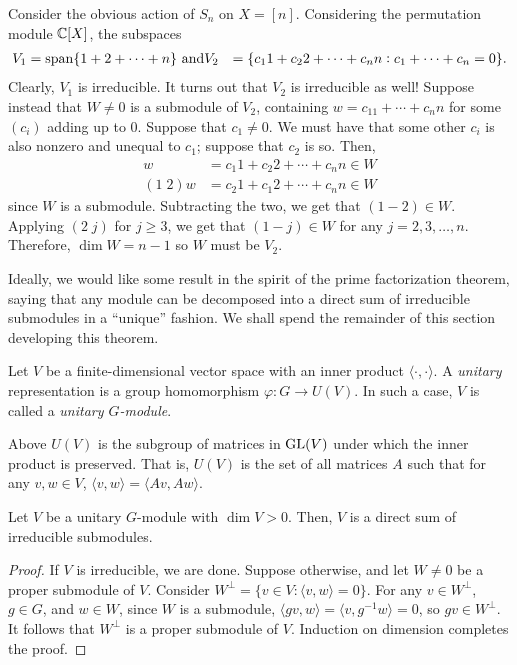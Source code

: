 	\begin{fex}
		Consider the obvious action of $S_n$ on $X = [n]$. Considering the permutation module $\mathbb{C}[X]$, the subspaces
		\begin{align*}
			V_1 &= \operatorname{span}\{1+2+\cdots+n\} \text{ and}
			V_2 &= \{c_11 + c_22 + \cdots + c_nn : c_1 + \cdots + c_n = 0\}.
		\end{align*}
		Clearly, $V_1$ is irreducible. It turns out that $V_2$ is irreducible as well! Suppose instead that $W \ne 0$ is a submodule of $V_2$, containing $w = c_11 + \cdots + c_nn$ for some $(c_i)$ adding up to $0$. Suppose that $c_1 \ne 0$. We must have that some other $c_i$ is also nonzero and unequal to $c_1$; suppose that $c_2$ is so. Then,
		\begin{align*}
			w &= c_1 1 + c_2 2 + \cdots + c_nn \in W \\
			(1\; 2) w &= c_2 1 + c_1 2 + \cdots + c_n n \in W
		\end{align*}
		since $W$ is a submodule. Subtracting the two, we get that $(1-2) \in W$. Applying $(2\; j)$ for $j \ge 3$, we get that $(1-j) \in W$ for any $j = 2,3,\ldots,n$. Therefore, $\dim W = n-1$ so $W$ must be $V_2$.
	\end{fex}

	Ideally, we would like some result in the spirit of the prime factorization theorem, saying that any module can be decomposed into a direct sum of irreducible submodules in a ``unique'' fashion. We shall spend the remainder of this section developing this theorem.

	\begin{fdef}
		Let $V$ be a finite-dimensional vector space with an inner product $\langle \cdot,\cdot\rangle$. A \emph{unitary} representation is a group homomorphism $\varphi : G \to U(V)$. In such a case, $V$ is called a \emph{unitary $G$-module}.
	\end{fdef}
	Above $U(V)$ is the subgroup of matrices in $\operatorname{GL}(V)$ under which the inner product is preserved. That is, $U(V)$ is the set of all matrices $A$ such that for any $v,w \in V$, $\langle v,w\rangle = \langle Av,Aw\rangle$.

	\begin{lemma}
		Let $V$ be a unitary $G$-module with $\dim V > 0$. Then, $V$ is a direct sum of irreducible submodules.
	\end{lemma}
	\begin{proof}
		If $V$ is irreducible, we are done. Suppose otherwise, and let $W \ne 0$ be a proper submodule of $V$. Consider $W^\perp = \{ v \in V : \langle v,w\rangle = 0 \}$. For any $v \in W^\perp$, $g \in G$, and $w \in W$, since $W$ is a submodule, $\langle gv,w\rangle = \langle v,g^{-1}w\rangle = 0$, so $gv \in W^\perp$. It follows that $W^\perp$ is a proper submodule of $V$. Induction on dimension completes the proof. 
	\end{proof}

